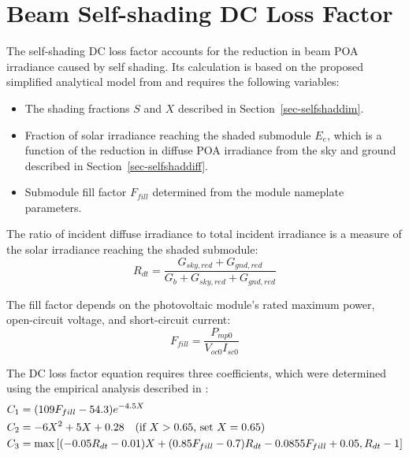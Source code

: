 \documentclass[12pt,letterpaper]{article}
\begin{document}

\section{Beam Self-shading DC Loss Factor} \label{sec-selfshaddc}

The self-shading DC loss factor accounts for the reduction in beam POA irradiance caused by self shading. Its calculation is based on the proposed simplified analytical model from \citep{deline2013a} and requires the following variables:
\begin{itemize}
\item The shading fractions $S$ and $X$ described in Section~\ref{sec-selfshaddim}.
\item Fraction of solar irradiance reaching the shaded submodule $E_e$, which is a function of the reduction in diffuse POA irradiance from the sky and ground described in Section~\ref{sec-selfshaddiff}.
\item Submodule fill factor $\mathit{F}_{fill}$ determined from the module nameplate parameters.
\end{itemize}

The ratio of incident diffuse irradiance to total incident irradiance is a measure of the solar irradiance reaching the shaded submodule:
\begin{equation}
R_{dt} = \frac{G_{sky,red}+G_{gnd,red}}{G_b+G_{sky,red}+G_{gnd,red}}
\end{equation}

The fill factor depends on the photovoltaic module's rated maximum power, open-circuit voltage, and short-circuit current:
\begin{equation}
F_{fill}=\frac{P_{mp0}}{V_{oc0}I_{sc0}}
\end{equation}

The DC loss factor equation requires three coefficients, which were determined using the empirical analysis described in \citet{deline2013a}:
\begin{align}
C_1 &= (109F_{fill}-54.3)e^{-4.5X} \notag\\
C_2 &= -6X^2+5X+0.28 \quad \text{(if $X>0.65$, set $X=0.65$)}\notag\\
C_3 &= \max\left[(-0.05R_{dt}-0.01)X+(0.85F_{fill}-0.7)R_{dt}-0.0855F_{fill}+0.05,R_{dt}-1\right]
\end{align}
\end{document}
